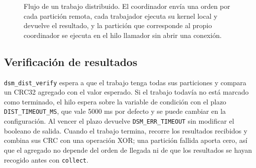 \begin{figure}[H]
\centering
{}
\caption{Flujo de un trabajo distribuido. El coordinador envía una orden por cada partición remota, cada trabajador ejecuta su kernel local y devuelve el resultado, y la partición que corresponde al propio coordinador se ejecuta en el hilo llamador sin abrir una conexión.}
\label{fig:distribuida-flujo}
\end{figure}

\subsection{Verificación de resultados}

\texttt{dsm\_dist\_verify} espera a que el trabajo tenga todas sus particiones y compara un CRC32 agregado con el valor esperado. Si el trabajo todavía no está marcado como terminado, el hilo espera sobre la variable de condición con el plazo \texttt{DIST\_TIMEOUT\_MS}, que vale 5000 ms por defecto y se puede cambiar en la configuración. Al vencer el plazo devuelve \texttt{DSM\_ERR\_TIMEOUT} sin modificar el booleano de salida. Cuando el trabajo termina, recorre los resultados recibidos y combina sus CRC con una operación XOR; una partición fallida aporta cero, así que el agregado no depende del orden de llegada ni de que los resultados se hayan recogido antes con \texttt{collect}.


